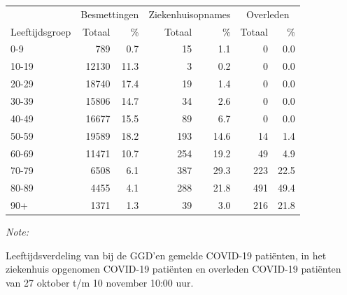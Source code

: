 \documentclass[
  english,
  man,floatsintext]{apa6}
\begin{document}
\begin{table}[H]
\centering\begingroup\fontsize{11}{13}\selectfont

\begin{threeparttable}
\begin{tabular}{lrrrrrr}
\toprule
\multicolumn{1}{c}{ } & \multicolumn{2}{c}{Besmettingen} & \multicolumn{2}{c}{Ziekenhuisopnames} & \multicolumn{2}{c}{Overleden} \\
\cmidrule(l{3pt}r{3pt}){2-3} \cmidrule(l{3pt}r{3pt}){4-5} \cmidrule(l{3pt}r{3pt}){6-7}
Leeftijdsgroep & Totaal & \% & Totaal & \% & Totaal & \%\\
\midrule
0-9 & 789 & 0.7 & 15 & 1.1 & 0 & 0.0\\
10-19 & 12130 & 11.3 & 3 & 0.2 & 0 & 0.0\\
20-29 & 18740 & 17.4 & 19 & 1.4 & 0 & 0.0\\
30-39 & 15806 & 14.7 & 34 & 2.6 & 0 & 0.0\\
40-49 & 16677 & 15.5 & 89 & 6.7 & 0 & 0.0\\
50-59 & 19589 & 18.2 & 193 & 14.6 & 14 & 1.4\\
60-69 & 11471 & 10.7 & 254 & 19.2 & 49 & 4.9\\
70-79 & 6508 & 6.1 & 387 & 29.3 & 223 & 22.5\\
80-89 & 4455 & 4.1 & 288 & 21.8 & 491 & 49.4\\
90+ & 1371 & 1.3 & 39 & 3.0 & 216 & 21.8\\
\bottomrule
\end{tabular}
\begin{tablenotes}
\item \textit{Note: } 
\item Leeftijdsverdeling van bij de GGD’en gemelde COVID-19 patiënten, in het ziekenhuis opgenomen COVID-19 patiënten en overleden COVID-19 patiënten van 27 oktober t/m 10 november 10:00 uur.
\end{tablenotes}
\end{threeparttable}
\endgroup{}
\end{table}
\end{document}
